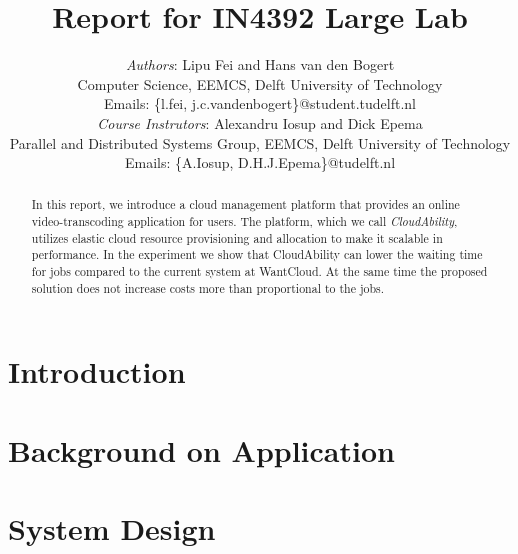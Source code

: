 \documentclass[10pt, a4paper, twoside, twocolumn, technote]{IEEEtran}
\begin{document}
\newcommand{\staterunning}
  {\textsc{running}}
\newcommand{\statepending}
  {\textsc{pending}}

\newcommand{\statefinished}
  {\textsc{finished}}
\newcommand{\statefailed}
  {\textsc{failed}}

\newcommand{\policystatic}
  {\textsc{static}}
\newcommand{\policysimpleelastic}
  {\textsc{simple elastic}}


\title{Report for IN4392 Large Lab}
\author{\textit{Authors}: Lipu Fei and Hans van den Bogert\\
  Computer Science, EEMCS, Delft University of Technology\\
  Emails: \{l.fei, j.c.vandenbogert\}@student.tudelft.nl\\
  \textit{Course Instrutors}: Alexandru Iosup and Dick Epema\\
  Parallel and Distributed Systems Group, EEMCS, Delft University of Technology\\
  Emails: \{A.Iosup, D.H.J.Epema\}@tudelft.nl}

\maketitle

\begin{abstract}
  In this report, we introduce a cloud management platform that
  provides an online video-transcoding application for users. The
  platform, which we call \emph{CloudAbility}, utilizes elastic cloud
  resource provisioning and allocation to make it scalable in
  performance. In the experiment we show that CloudAbility can lower
  the waiting time for jobs compared to the current system at
  WantCloud. At the same time the proposed solution does not increase
  costs more than proportional to the jobs.
\end{abstract}

\section{Introduction}


\section{Background on Application}\label{background}


\section{System Design}\label{design}

\end{document}
